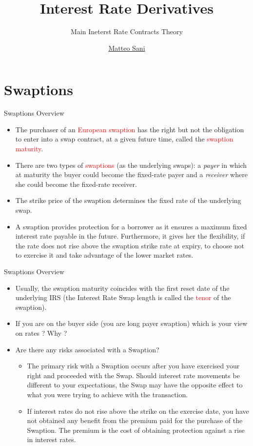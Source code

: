 \documentclass{beamer}
\title{Interest Rate Derivatives}
\subtitle{Main Ineterst Rate Contracts Theory}
\author{\href{mailto:matteo.sani@unisi.it}{Matteo Sani}}
\begin{document}
\begin{frame}[plain]
  \maketitle
\end{frame}

\section{Swaptions}
\begin{frame}{Swaptions Overview}
\begin{itemize}
	\item<1-> The purchaser of an \textcolor{red}{European swaption} has the right but not the obligation to enter into a swap contract, at a given future time, called the \textcolor{red}{swaption maturity}.
	\item<2-> There are two types of \textcolor{red}{swaptions} (as the underlying swaps): a \emph{payer} in which at maturity the buyer could become the fixed-rate payer and a \emph{receiver} where she could become the fixed-rate receiver.
	\item <3-> The strike price of the swaption determines the fixed rate of the underlying swap.
	\item<4-> A swaption provides protection for a borrower as it ensures a maximum fixed interest rate payable in the future. Furthermore, it gives her the flexibility, if the rate does not rise above the swaption strike rate at expiry, to choose not to exercise it and take advantage of the lower market rates.
\end{itemize}
\end{frame}

\begin{frame}{Swaptions Overview}
	\begin{itemize}
	\item<1-> Usually, the swaption maturity coincides with the first reset date of the underlying IRS (the Interest Rate Swap length is called the \textcolor{red}{tenor} of the swaption).	
	\item<2-> If you are on the buyer side (you are long payer swaption) which is your view on rates ? Why ?
	\item<3-> Are there any risks associated with a Swaption?
	\begin{itemize}
		\item<4-> The primary risk with a Swaption occurs after you have exercised your right and proceeded with the Swap. Should interest rate movements be different to your expectations, the Swap may have the opposite effect to what you were trying to achieve with the transaction. 
		\item<5-> If interest rates do not rise above the strike on the exercise date, you have not obtained any benefit from the premium paid for the purchase of the Swaption. The premium is the cost of obtaining protection against a rise in interest rates.
	\end{itemize}
\end{itemize}
\end{frame}
\end{document}
